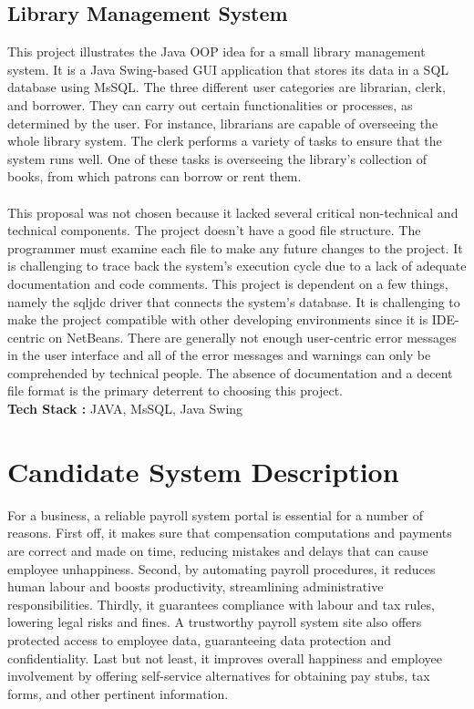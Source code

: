 \documentclass[12pt,english]{article}
\begin{document}
    
    
    

    \subsection{Library Management System}
    This project illustrates the Java OOP idea for a small library management system. It is a Java Swing-based GUI application that stores its data in a SQL database using MsSQL. The three different user categories are librarian, clerk, and borrower. They can carry out certain functionalities or processes, as determined by the user. For instance, librarians are capable of overseeing the whole library system. The clerk performs a variety of tasks to ensure that the system runs well. One of these tasks is overseeing the library's collection of books, from which patrons can borrow or rent them.\\\\
    This proposal was not chosen because it lacked several critical non-technical and technical components. The project doesn't have a good file structure. The programmer must examine each file to make any future changes to the project. It is challenging to trace back the system's execution cycle due to a lack of adequate documentation and code comments. This project is dependent on a few things, namely the sqljdc driver that connects the system's database. It is challenging to make the project compatible with other developing environments since it is IDE-centric on NetBeans. There are generally not enough user-centric error messages in the user interface and all of the error messages and warnings can only be comprehended by technical people. The absence of documentation and a decent file format is the primary deterrent to choosing this project. \\

    \textbf{Tech Stack : }JAVA, MsSQL, Java Swing \\

\section{Candidate System Description}

For a business, a reliable payroll system portal is essential for a number of reasons. First off, it makes sure that compensation computations and payments are correct and made on time, reducing mistakes and delays that can cause employee unhappiness. Second, by automating payroll procedures, it reduces human labour and boosts productivity, streamlining administrative responsibilities. Thirdly, it guarantees compliance with labour and tax rules, lowering legal risks and fines. A trustworthy payroll system site also offers protected access to employee data, guaranteeing data protection and confidentiality. Last but not least, it improves overall happiness and employee involvement by offering self-service alternatives for obtaining pay stubs, tax forms, and other pertinent information.
\end{document}
